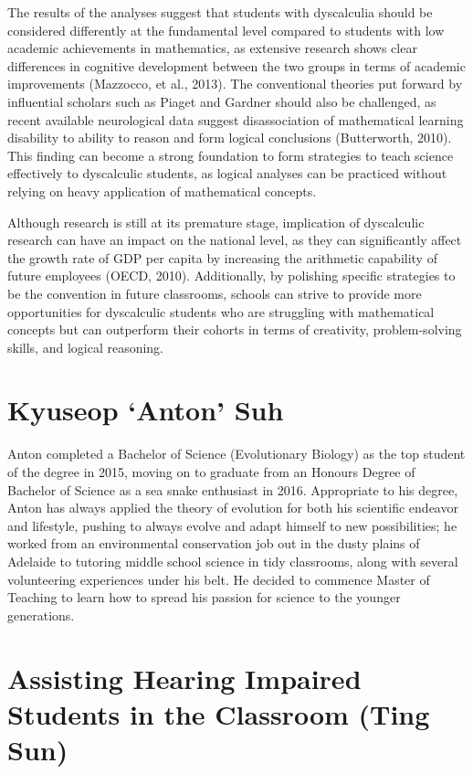 \documentclass[twoside,12pt,a4paper,notitlepage]{memoir}
\begin{document}
The results of the analyses suggest that students with dyscalculia should be considered differently at the fundamental level compared to students with low academic achievements in mathematics, as extensive research shows clear differences in cognitive development between the two groups in terms of academic improvements (Mazzocco, et al., 2013). The conventional theories put forward by influential scholars such as Piaget and Gardner should also be challenged, as recent available neurological data suggest disassociation of mathematical learning disability to ability to reason and form logical conclusions (Butterworth, 2010). This finding can become a strong foundation to form strategies to teach science effectively to dyscalculic students, as logical analyses can be practiced without relying on heavy application of mathematical concepts.

Although research is still at its premature stage, implication of dyscalculic research can have an impact on the national level, as they can significantly affect the growth rate of GDP per capita by increasing the arithmetic capability of future employees (OECD, 2010). Additionally, by polishing specific strategies to be the convention in future classrooms, schools can strive to provide more opportunities for dyscalculic students who are struggling with mathematical concepts but can outperform their cohorts in terms of creativity, problem-solving skills, and logical reasoning.

\section*{Kyuseop `Anton' Suh}

Anton completed a Bachelor of Science (Evolutionary Biology) as the top student of the degree in 2015, moving on to graduate from an Honours Degree of Bachelor of Science as a sea snake enthusiast in 2016. Appropriate to his degree, Anton has always applied the theory of evolution for both his scientific endeavor and lifestyle, pushing to always evolve and adapt himself to new possibilities; he worked from an environmental conservation job out in the dusty plains of Adelaide to tutoring middle school science in tidy classrooms, along with several volunteering experiences under his belt. He decided to commence Master of Teaching to learn how to spread his passion for science to the younger generations.



\pagebreak
\section*{Assisting Hearing Impaired Students in the Classroom (Ting Sun)}
\label{aut:sun}
\end{document}
